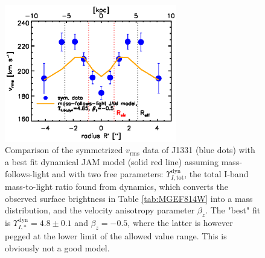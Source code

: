 \begin{figure}
  \centering
  \includegraphics[height=6cm]{fig/jam_A2_vrms.ps}
  \caption{Comparison of the symmetrized $v_\text{rms}$ data of J1331 (blue dots) with a best fit dynamical JAM model (solid red line) assuming mass-follows-light and with two free parameters: $\Upsilon_{I,\text{tot}}^\text{dyn}$, the total I-band mass-to-light ratio found from dynamics, which converts the observed surface brightness in Table \ref{tab:MGEF814W} into a mass distribution, and the velocity anisotropy parameter $\beta_z$. The "best" fit is $\Upsilon_{I,*}^\text{dyn} = 4.8 \pm 0.1$ and $\beta_z = -0.5$, where the latter is however pegged at the lower limit of the allowed value range. This is obviously not a good model.}
  \label{fig:JAM_modelA2}
\end{figure}


